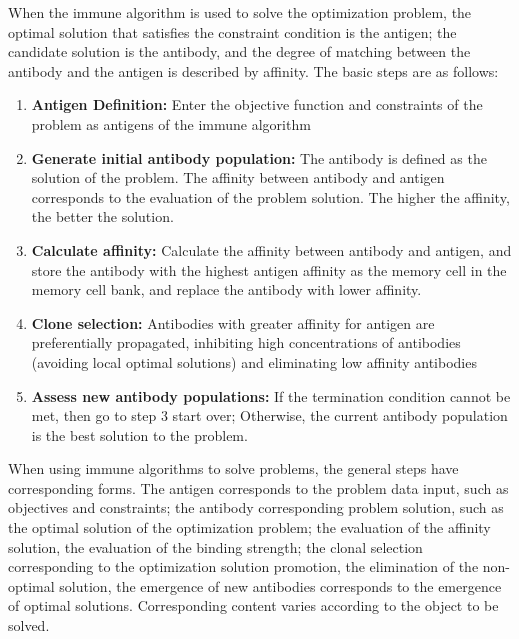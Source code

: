 \documentclass[11pt,a4paper,oldfontcommands]{memoir}
\begin{document}
When the immune algorithm is used to solve the optimization problem, the optimal solution that satisfies the constraint condition is the antigen; the candidate solution is the antibody, and the degree of matching between the antibody and the antigen is described by affinity. The basic steps are as follows:
\begin{enumerate}[Step 1]
\item{ \textbf{Antigen Definition:} 
Enter the objective function and constraints of the problem as antigens of the immune algorithm}
\item{ \textbf{Generate initial antibody population:} 
The antibody is defined as the solution of the problem. The affinity between antibody and antigen corresponds to the evaluation of the problem solution. The higher the affinity, the better the solution.}
\item{ \textbf{Calculate affinity:} 
Calculate the affinity between antibody and antigen, and store the antibody with the highest antigen affinity as the memory cell in the memory cell bank, and replace the antibody with lower affinity.
}
\item{\textbf{Clone selection:} 
Antibodies with greater affinity for antigen are preferentially propagated, inhibiting high concentrations of antibodies (avoiding local optimal solutions) and eliminating low affinity antibodies}
\item{\textbf{Assess new antibody populations:} 
If the termination condition cannot be met, then go to step 3 start over; Otherwise, the current antibody population is the best solution to the problem.}
\end{enumerate}

When using immune algorithms to solve problems, the general steps have corresponding forms. The antigen corresponds to the problem data input, such as objectives and constraints; the antibody corresponding problem solution, such as the optimal solution of the optimization problem; the evaluation of the affinity solution, the evaluation of the binding strength; the clonal selection corresponding to the optimization solution promotion, the elimination of the non-optimal solution, the emergence of new antibodies corresponds to the emergence of optimal solutions. Corresponding content varies according to the object to be solved.

\end{document}
